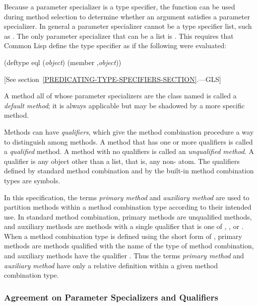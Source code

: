 Because a parameter specializer is a type specifier, the function 
 can be used during method selection to determine whether an
argument satisfies a parameter specializer.  In general a
parameter specializer cannot be a type specifier list, such as 
.  The only parameter specializer that can
be a list is .  This requires that
Common Lisp define the type specifier 
as if the following were evaluated:

\begin{lisp}
(deftype eql (\emph{object\/}) {\Xbq}(member ,\emph{object\/}))
\end{lisp}
[See section~\ref{PREDICATING-TYPE-SPECIFIERS-SECTION}.---GLS]

A method all of whose parameter specializers are the class named 
 is called a \emph{default method}; it is always applicable but
may be shadowed by a more specific method.

Methods can have \emph{qualifiers}, which give the method combination
procedure a way to distinguish among methods.  A method that has one
or more qualifiers is called a \emph{qualified\/} method.
A method with no qualifiers is called an \emph{unqualified method}. 
A qualifier is any object other than a list, that is,
any non- atom.  The qualifiers defined by standard method combination
and by the built-in method combination types are symbols.

In this specification, the terms \emph{primary method\/} and \emph{
auxiliary method\/} are used to partition methods within a method
combination type according to their intended use.  In standard method
combination, primary methods are unqualified methods, and auxiliary
methods are methods with a single qualifier that is one of 
, , or .  When a method combination
type is defined using the short form of 
, primary methods are methods qualified with
the name of the type of method combination, and auxiliary methods have
the qualifier .  Thus the terms \emph{primary method\/}
and \emph{auxiliary method\/} have only a relative definition within a
given method combination type.

\subsubsection{Agreement on Parameter Specializers and Qualifiers}
\label{Agreement-on-Parameter-Specializers-and-Qualifiers-SECTION}

